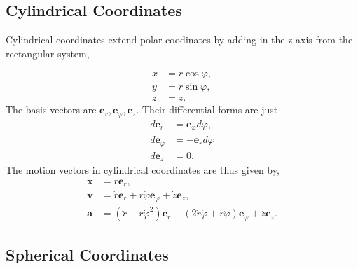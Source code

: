 \documentclass[
  letterpaper,
  DIV=11,
  numbers=noendperiod]{scrreprt}
\begin{document}
\hypertarget{cylindrical-coordinates}{%
\subsection{Cylindrical Coordinates}\label{cylindrical-coordinates}}

Cylindrical coordinates extend polar coodinates by adding in the z-axis
from the rectangular system,

\[
\begin{align*} 
x &=  r\cos\varphi, \\ 
y &=  r\sin\varphi, \\
z &= z.
\end{align*}
\] The basis vectors are
\(\mathbf{e}_r, \mathbf{e}_\varphi, \mathbf{e}_z\). Their differential
forms are just \[
\begin{align*} 
d\mathbf{e}_r &= \mathbf{e}_\varphi d\varphi, \\ 
d\mathbf{e}_\varphi &= -\mathbf{e}_r d\varphi \\ 
d\mathbf{e}_z &= 0. 
\end{align*}
\] The motion vectors in cylindrical coordinates are thus given by, \[
\begin{align*}
\mathbf{x} &= r\mathbf{e}_r, \\
\mathbf{v} &= \dot r \mathbf{e}_r + r\dot \varphi \mathbf{e}_\varphi + \dot z \mathbf{e}_z , \\
\mathbf{a} &= (\ddot r - r\dot \varphi^2)\mathbf{e}_r + (2\dot r \dot \varphi + r\ddot \varphi)\mathbf{e}_\varphi + \ddot z \mathbf{e}_z.
\end{align*}
\]

\hypertarget{spherical-coordinates}{%
\subsection{Spherical Coordinates}\label{spherical-coordinates}}
\end{document}

